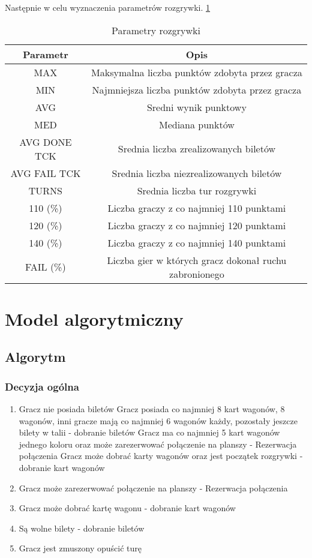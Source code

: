 \documentclass[12pt, oneside]{report}
\begin{document}
Następnie w celu wyznaczenia parametrów rozgrywki.  \ref{table:outputparam}

\begin{table}[h]
	\begin{center}
		\begin{tabular}{| c | c |} \hline
			Parametr  & Opis \\ \hline
			MAX & Maksymalna liczba punktów zdobyta przez gracza \\ \hline
			MIN & Najmniejsza liczba punktów zdobyta przez gracza \\ \hline
			AVG & Sredni wynik punktowy \\ \hline
			MED & Mediana punktów \\ \hline
			AVG DONE TCK & Srednia liczba zrealizowanych biletów \\ \hline
			AVG FAIL TCK & Srednia liczba niezrealizowanych biletów \\ \hline
			TURNS & Srednia liczba tur rozgrywki \\ \hline
			110 (\%) & Liczba graczy z co najmniej 110 punktami \\ \hline
			120 (\%) & Liczba graczy z co najmniej 120 punktami \\ \hline
			140 (\%) & Liczba graczy z co najmniej 140 punktami \\ \hline
			FAIL (\%) & Liczba gier w których gracz dokonał ruchu zabronionego \\ \hline
		\end{tabular}
		\caption{Parametry rozgrywki}
		\label{table:outputparam}
	\end{center}
\end{table}


\chapter{Model algorytmiczny}
\section{Algorytm}
\subsection{Decyzja ogólna}
\begin{enumerate}
	\item Gracz nie posiada biletów
	 Gracz posiada co najmniej 8 kart wagonów, 8 wagonów, inni gracze mają co najmniej 6 wagonów każdy, pozostały jeszcze bilety w talii - dobranie biletów
	 Gracz ma co najmniej 5 kart wagonów jednego koloru oraz może zarezerwować połączenie na planszy - Rezerwacja połączenia
	 Gracz może dobrać karty wagonów oraz jest początek rozgrywki - dobranie kart wagonów
	\item Gracz może zarezerwować połączenie na planszy - Rezerwacja połączenia
	\item Gracz może dobrać kartę wagonu - dobranie kart wagonów
	\item Są wolne bilety - dobranie biletów
	\item Gracz jest zmuszony opuścić turę
\end{enumerate}
\end{document}
